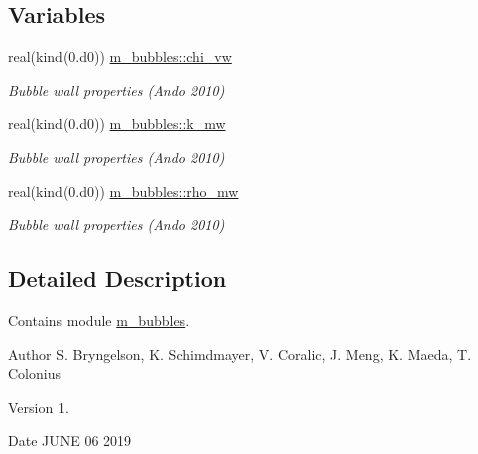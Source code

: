 \subsection*{Variables}
\begin{DoxyCompactItemize}
\item 
real(kind(0.d0)) \hyperlink{namespacem__bubbles_afaab8f73b4f1cc413ad9ee2c2d32512a}{m\+\_\+bubbles\+::chi\+\_\+vw}
\begin{DoxyCompactList}\small\item\em Bubble wall properties (Ando 2010) \end{DoxyCompactList}\item 
real(kind(0.d0)) \hyperlink{namespacem__bubbles_a1ffd14079710afb89dad86916cbb91fc}{m\+\_\+bubbles\+::k\+\_\+mw}
\begin{DoxyCompactList}\small\item\em Bubble wall properties (Ando 2010) \end{DoxyCompactList}\item 
real(kind(0.d0)) \hyperlink{namespacem__bubbles_adeca2bd43645a6f7bcd59c88151eb3bc}{m\+\_\+bubbles\+::rho\+\_\+mw}
\begin{DoxyCompactList}\small\item\em Bubble wall properties (Ando 2010) \end{DoxyCompactList}\end{DoxyCompactItemize}


\subsection{Detailed Description}
Contains module \hyperlink{namespacem__bubbles}{m\+\_\+bubbles}. 

\begin{DoxyAuthor}{Author}
S. Bryngelson, K. Schimdmayer, V. Coralic, J. Meng, K. Maeda, T. Colonius 
\end{DoxyAuthor}
\begin{DoxyVersion}{Version}
1. 
\end{DoxyVersion}
\begin{DoxyDate}{Date}
J\+U\+NE 06 2019 
\end{DoxyDate}
